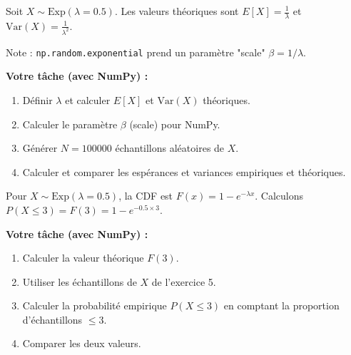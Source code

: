 \begin{exercicebox}
Soit $X \sim \text{Exp}(\lambda=0.5)$. Les valeurs théoriques sont $E[X] = \frac{1}{\lambda}$ et $\text{Var}(X) = \frac{1}{\lambda^2}$.

Note : \texttt{np.random.exponential} prend un paramètre "scale" $\beta = 1/\lambda$.

\textbf{Votre tâche (avec NumPy) :}
\begin{enumerate}
    \item Définir $\lambda$ et calculer $E[X]$ et $\text{Var}(X)$ théoriques.
    \item Calculer le paramètre $\beta$ (scale) pour NumPy.
    \item Générer $N=100000$ échantillons aléatoires de $X$.
    \item Calculer et comparer les espérances et variances empiriques et théoriques.
\end{enumerate}
\end{exercicebox}

\begin{exercicebox}
Pour $X \sim \text{Exp}(\lambda=0.5)$, la CDF est $F(x) = 1 - e^{-\lambda x}$.
Calculons $P(X \le 3) = F(3) = 1 - e^{-0.5 \times 3}$.

\textbf{Votre tâche (avec NumPy) :}
\begin{enumerate}
    \item Calculer la valeur théorique $F(3)$.
    \item Utiliser les échantillons de $X$ de l'exercice 5.
    \item Calculer la probabilité empirique $P(X \le 3)$ en comptant la proportion d'échantillons $\le 3$.
    \item Comparer les deux valeurs.
\end{enumerate}
\end{exercicebox}

